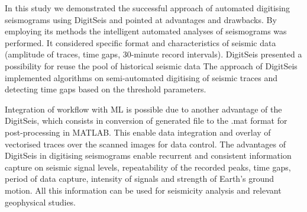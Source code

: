 \documentclass[informatics,article,submit,moreauthors,pdftex]{Definitions/mdpi}
\begin{document}
In this study we demonstrated the successful approach of automated digitising seismograms using DigitSeis and pointed at advantages and drawbacks. By employing its methods the intelligent automated analyses of seismograms was performed. It considered specific format and characteristics of seismic data (amplitude of traces, time gaps, 30-minute record intervals). DigitSeis presented a possibility for reuse the pool of historical seismic data The approach of DigitSeis implemented algorithms on semi-automated digitising of seismic traces and detecting time gaps based on the threshold parameters. 

Integration of workflow with \ac{ML} is possible due to another advantage of the DigitSeis, which consists in conversion of generated file to the .mat format for post-processing in MATLAB. This enable data integration and overlay of vectorised traces over the scanned images for data control. The advantages of DigitSeis in digitising seismograms enable recurrent and consistent information capture on seismic signal levels, repeatability of the recorded peaks, time gaps, period of data capture, intensity of signals and strength of Earth's ground motion. All this information can be used for seismicity analysis and relevant geophysical studies. 


\vspace{6pt} 



\end{document}

